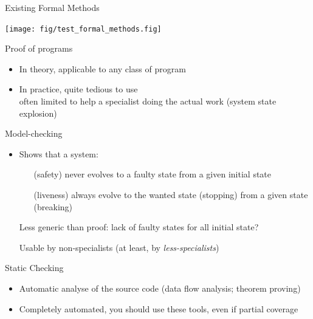 \begin{frame}[squeeze]{Existing Formal Methods}
  \centerline{\texttt{[image: fig/test\_formal\_methods.fig]}}

  \begin{block}{Proof of programs}
    \begin{itemize}
    \item In theory, applicable to any class of program
    \item In practice, quite tedious to use\\
      often limited to help a specialist doing the actual work {\small(system state explosion)}
    \end{itemize}
  \end{block}\vspace{-.3\baselineskip}

   \begin{block}{Model-checking}
     \begin{itemize}
     \item {} Shows that a system:
       \begin{itemize}
       \item[(safety)] never evolves to a faulty state from a given initial state
       \item[(liveness)] always evolve to the wanted state {\small(stopping)} from a
         given state {\small(breaking)}
       \end{itemize}
     \item[\Frownie] Less generic than proof: lack of faulty states \alert{for all}
       initial state?
     \item[\Smiley] Usable by non-specialists (at least, by \textit{less-specialists})
     \end{itemize}
   \end{block} \vspace{-.3\baselineskip}

   \begin{block}{Static Checking}
     \begin{itemize}\vspace{-.2\baselineskip}
     \item Automatic analyse of the source code {\small(data flow analysis; theorem proving)}
     \item Completely automated, you should use these tools, even if partial coverage
     \end{itemize}
   \end{block}
\end{frame}

